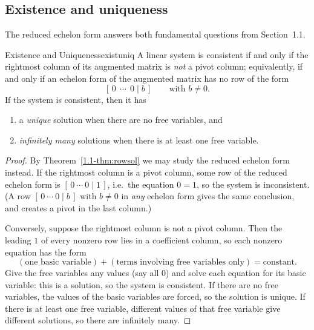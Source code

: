 \documentclass[11pt]{article}
\begin{document}
\subsection*{Existence and uniqueness}
 
The reduced echelon form answers both fundamental questions from Section~1.1.
 
\begin{thm}{Existence and Uniqueness}{existuniq}
A linear system is consistent if and only if the rightmost column of its augmented matrix is \emph{not}
a pivot column; equivalently, if and only if an echelon form of the augmented matrix has no row of the form
\[
[\,0\ \ \cdots\ \ 0\mid b\,]\qquad\text{with } b\neq0 .
\]
If the system is consistent, then it has
\begin{enumerate}[label=(\roman*),itemsep=1pt]
  \item a \emph{unique} solution when there are no free variables, and
  \item \emph{infinitely many} solutions when there is at least one free variable.
\end{enumerate}
\end{thm}
 
\begin{proof}
By Theorem~\ref{1.1-thm:rowsol} we may study the reduced echelon form instead. If the rightmost column is a pivot
column, some row of the reduced echelon form is $[\,0\ \cdots\ 0\mid1\,]$, i.e.\ the equation $0=1$, so the
system is inconsistent. (A row $[\,0\ \cdots\ 0\mid b\,]$ with $b\ne0$ in \emph{any} echelon form gives the same
conclusion, and creates a pivot in the last column.)
 
Conversely, suppose the rightmost column is not a pivot column. Then the leading $1$ of every nonzero row lies
in a coefficient column, so each nonzero equation has the form
\[
(\text{one basic variable})+(\text{terms involving free variables only})=\text{constant}.
\]
Give the free variables any values (say all $0$) and solve each equation for its basic variable: this is a
solution, so the system is consistent. If there are no free variables, the values of the basic variables are forced,
so the solution is unique. If there is at least one free variable, different values of that free variable give
different solutions, so there are infinitely many.
\end{proof}
 
\end{document}

